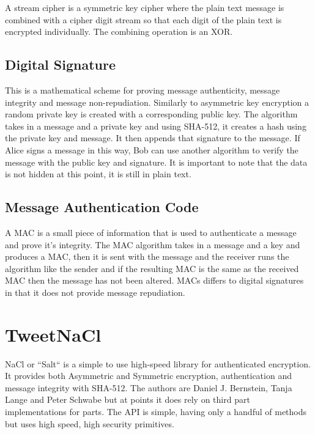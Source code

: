 A stream cipher is a symmetric key cipher where the plain text message is combined with a cipher digit stream so that each digit of the plain text is encrypted individually. The combining operation is an XOR.

\subsection{Digital Signature}

This is a mathematical scheme for proving message authenticity, message integrity and message non-repudiation. Similarly to asymmetric key encryption a random private key is created with a corresponding public key. The algorithm takes in a message and a private key and using SHA-512, it creates a hash using the private key and message. It then appends that signature to the message. If Alice signs a message in this way, Bob can use another algorithm to verify the message with the public key and signature. It is important to note that the data is not hidden at this point, it is still in plain text.

\subsection{Message Authentication Code}

A MAC is a small piece of information that is used to authenticate a message and prove it's integrity. The MAC algorithm takes in a message and a key and produces a MAC, then it is sent with the message and the receiver runs the algorithm like the sender and if the resulting MAC is the same as the received MAC then the message has not been altered. MACs differs to digital signatures in that it does not provide message repudiation.

\section{TweetNaCl}

NaCl or ``Salt`` is a simple to use high-speed library for authenticated encryption. It provides both Asymmetric and Symmetric encryption, authentication and message integrity with SHA-512. The authors are Daniel J. Bernstein, Tanja Lange and Peter Schwabe but at points it does rely on third part implementations for parts. The API is simple, having only a handful of methods but uses high speed, high security primitives\cite{naclsmall}.

